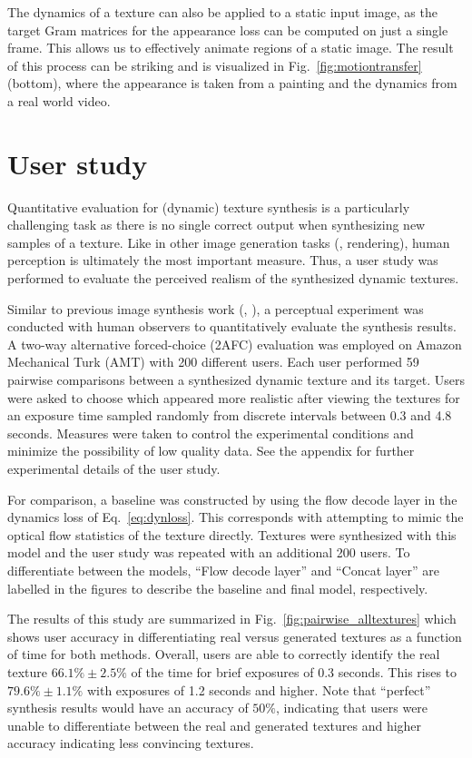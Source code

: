 The dynamics of a texture can also be applied to a static input image,
as the target Gram matrices for the appearance loss can be computed
on just a single frame.
This allows us to effectively animate regions of a static image.
The result of this process can be striking and is visualized in
Fig.\ \ref{fig:motiontransfer} (bottom), where the appearance is 
taken from a painting and the dynamics from a real world video.



\section{User study}\label{sec:user_study}

Quantitative evaluation for (dynamic) texture synthesis is a particularly
challenging task as there is no single correct output when 
synthesizing new samples of a texture.
Like in other image generation tasks (\eg, rendering), 
human perception is ultimately the most important measure.
Thus, a user study was performed to evaluate the perceived 
realism of the synthesized dynamic textures.

Similar to previous image synthesis work (\eg, \cite{chen2017}), 
a perceptual experiment was conducted with human observers to 
quantitatively evaluate the synthesis results.
A two-way alternative forced-choice (2AFC) evaluation was employed on Amazon Mechanical
Turk (AMT) with 200 different users. Each user performed 59
pairwise comparisons between a synthesized dynamic texture and 
its target.
Users were asked to choose which appeared more realistic
after viewing the textures for an exposure time sampled
randomly from discrete intervals between 0.3 and 4.8 seconds.
Measures were taken to control the experimental conditions and
minimize the possibility of low quality data.
See the appendix  for further experimental
details of the user study.

For comparison, a baseline was constructed by using the 
flow decode layer in the dynamics loss of Eq.\ \ref{eq:dynloss}.
This corresponds with attempting to mimic the optical flow 
statistics of the texture directly.
Textures were synthesized with this model and the user study
was repeated with an additional 200 users.
To differentiate between the models, ``Flow decode layer'' 
and ``Concat layer'' are labelled in the figures to describe the
baseline and final model, respectively.

The results of this study are summarized in
Fig.\ \ref{fig:pairwise_alltextures} which shows user accuracy in
differentiating real versus generated textures as a function of
time for both methods.
Overall, users are able to correctly identify the real texture
$66.1\% \pm 2.5\%$ of the time for brief 
exposures of 0.3 seconds.
This rises to $79.6\% \pm 1.1\%$ with exposures of 1.2 seconds 
and higher.
Note that ``perfect'' synthesis results would have an accuracy
of $50\%$, indicating that users were unable to differentiate 
between the real and generated textures and higher accuracy 
indicating less convincing textures.

